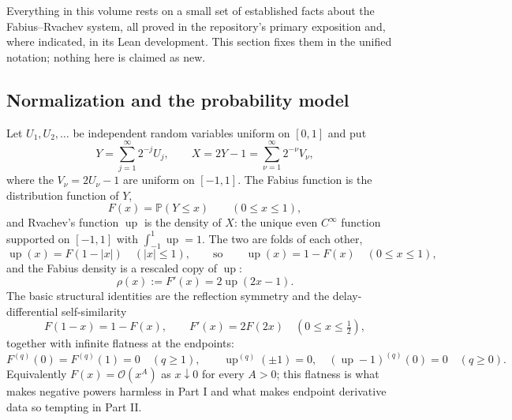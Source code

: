 \documentclass[11pt,oneside]{article}
\numberwithin{equation}{section}
\theoremstyle{definition}
\theoremstyle{remark}
\newcommand{\Prob}{\mathbb P}
\newcommand{\Up}{\operatorname{up}}
\newcommand{\bigO}{\mathcal O}
\newcommand{\abs}[1]{\left\lvert #1\right\rvert}
\begin{document}
Everything in this volume rests on a small set of established facts
about the Fabius--Rvachev system, all proved in the repository's primary
exposition \cite{ProveItPrimary} and, where indicated, in its Lean
development.  This section fixes them in the unified notation; nothing
here is claimed as new.

\subsection{Normalization and the probability model}
\label{sec:normalization}

Let $U_1,U_2,\ldots$ be independent random variables uniform on
$[0,1]$ and put
\begin{equation}
 Y=\sum_{j=1}^{\infty}2^{-j}U_j,
 \qquad
 X=2Y-1=\sum_{\nu=1}^{\infty}2^{-\nu}V_\nu,
 \label{eq:Y-law}
\end{equation}
where the $V_\nu=2U_\nu-1$ are uniform on $[-1,1]$.  The Fabius
function is the distribution function of $Y$,
\begin{equation}
 F(x)=\Prob(Y\le x)\qquad(0\le x\le1),
 \label{eq:F-def}
\end{equation}
and Rvachev's function $\Up$ is the density of $X$: the unique even
$C^\infty$ function supported on $[-1,1]$ with
$\int_{-1}^1\Up=1$.  The two are folds of each other,
\begin{equation}
 \Up(x)=F(1-\abs x)\quad(\abs x\le1),
 \qquad\text{so}\qquad
 \Up(x)=1-F(x)\quad(0\le x\le1),
 \label{eq:up-fold}
\end{equation}
and the Fabius density is a rescaled copy of $\Up$:
\begin{equation}
 \rho(x):=F'(x)=2\Up(2x-1).
 \label{eq:fabius-density}
\end{equation}
The basic structural identities are the reflection symmetry and the
delay-differential self-similarity
\begin{equation}
 F(1-x)=1-F(x),
 \qquad
 F'(x)=2F(2x)\quad(0\le x\le\tfrac12),
 \label{eq:F-symmetry}
\end{equation}
together with infinite flatness at the endpoints:
\begin{equation}
 F^{(q)}(0)=F^{(q)}(1)=0
 \quad(q\ge1),
 \qquad
 \Up^{(q)}(\pm1)=0,\quad
 (\Up-1)^{(q)}(0)=0\quad(q\ge0).
 \label{eq:flatness}
\end{equation}
Equivalently $F(x)=\bigO(x^A)$ as $x\downarrow0$ for every $A>0$; this
flatness is what makes negative powers harmless in Part I and what makes
endpoint derivative data so tempting in Part II.
\end{document}
